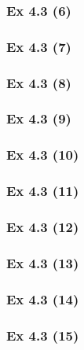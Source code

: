 \subsubsection{Ex 4.3 (6)}\label{sec:Ex_4.3.6}

\subsubsection{Ex 4.3 (7)}\label{sec:Ex_4.3.7}

\subsubsection{Ex 4.3 (8)}\label{sec:Ex_4.3.8}

\subsubsection{Ex 4.3 (9)}\label{sec:Ex_4.3.9}

\subsubsection{Ex 4.3 (10)}\label{sec:Ex_4.3.10}

\newpage		%

\subsubsection{Ex 4.3 (11)}\label{sec:Ex_4.3.11}

\subsubsection{Ex 4.3 (12)}\label{sec:Ex_4.3.12}

\subsubsection{Ex 4.3 (13)}\label{sec:Ex_4.3.13}

\subsubsection{Ex 4.3 (14)}\label{sec:Ex_4.3.14}

\subsubsection{Ex 4.3 (15)}\label{sec:Ex_4.3.15}

